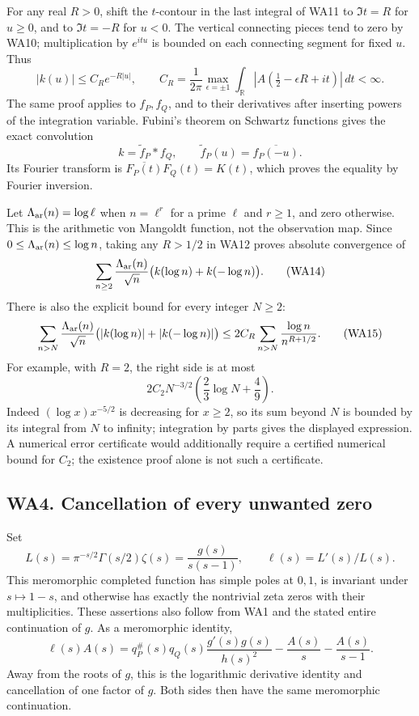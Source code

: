 \documentclass[
  10pt,
  a4paper,
]{article}
\begin{document}
For any real \(R>0\), shift the \(t\)-contour in the last integral of
WA11 to \(\Im t=R\) for \(u\ge0\), and to \(\Im t=-R\) for \(u<0\). The
vertical connecting pieces tend to zero by WA10; multiplication by
\(e^{itu}\) is bounded on each connecting segment for fixed \(u\). Thus
\[
|k(u)|\le C_R e^{-R|u|},\qquad
C_R=\frac1{2\pi}\max_{\epsilon=\pm1}
\int_{\mathbb R}|A(\tfrac12-\epsilon R+it)|\,dt<\infty.
\tag{WA12}
\] The same proof applies to \(f_P,f_Q\), and to their derivatives after
inserting powers of the integration variable. Fubini's theorem on
Schwartz functions gives the exact convolution \[
k=\widetilde f_P*f_Q,\qquad \widetilde f_P(u)=\overline{f_P(-u)}.
\tag{WA13}
\] Its Fourier transform is \(\overline{F_P(t)}F_Q(t)=K(t)\), which
proves the equality by Fourier inversion.

Let \(\Lambda_{\rm ar}(n)=\log \ell\) when \(n=\ell^r\) for a prime
\(\ell\) and \(r\ge1\), and zero otherwise. This is the arithmetic von
Mangoldt function, not the observation map. Since
\(0\le\Lambda_{\rm ar}(n)\le\log n\), taking any \(R>1/2\) in WA12
proves absolute convergence of \[
\sum_{n\ge2}\frac{\Lambda_{\rm ar}(n)}{\sqrt n}
\bigl(k(\log n)+k(-\log n)\bigr).
\tag{WA14}
\] There is also the explicit bound for every integer \(N\ge2\): \[
\sum_{n>N}\frac{\Lambda_{\rm ar}(n)}{\sqrt n}
\bigl(|k(\log n)|+|k(-\log n)|\bigr)
\le 2C_R\sum_{n>N}\frac{\log n}{n^{R+1/2}}.
\tag{WA15}
\] For example, with \(R=2\), the right side is at most \[
2C_2N^{-3/2}\left(\frac23\log N+\frac49\right).
\tag{WA16}
\] Indeed \((\log x)x^{-5/2}\) is decreasing for \(x\ge2\), so its sum
beyond \(N\) is bounded by its integral from \(N\) to infinity;
integration by parts gives the displayed expression. A numerical error
certificate would additionally require a certified numerical bound for
\(C_2\); the existence proof alone is not such a certificate.

\subsection{WA4. Cancellation of every unwanted
zero}\label{wa4.-cancellation-of-every-unwanted-zero}

Set \[
L(s)=\pi^{-s/2}\Gamma(s/2)\zeta(s)=\frac{g(s)}{s(s-1)},
\qquad \ell(s)=L'(s)/L(s).
\tag{WA17}
\] This meromorphic completed function has simple poles at \(0,1\), is
invariant under \(s\mapsto1-s\), and otherwise has exactly the
nontrivial zeta zeros with their multiplicities. These assertions also
follow from WA1 and the stated entire continuation of \(g\). As a
meromorphic identity, \[
\ell(s)A(s)=q_P^\#(s)q_Q(s)\frac{g'(s)g(s)}{h(s)^2}
-\frac{A(s)}s-\frac{A(s)}{s-1}.
\tag{WA18}
\] Away from the roots of \(g\), this is the logarithmic derivative
identity and cancellation of one factor of \(g\). Both sides then have
the same meromorphic continuation.
\end{document}
